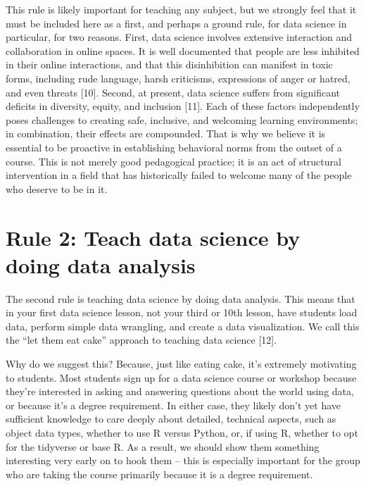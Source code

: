 \documentclass[
  10pt,
  letterpaper,
]{article}
\begin{document}
This rule is likely important for teaching any subject, but we strongly
feel that it must be included here as a first, and perhaps a ground
rule, for data science in particular, for two reasons. First, data
science involves extensive interaction and collaboration in online
spaces. It is well documented that people are less inhibited in their
online interactions, and that this disinhibition can manifest in toxic
forms, including rude language, harsh criticisms, expressions of anger
or hatred, and even threats {[}10{]}. Second, at present, data science
suffers from significant deficits in diversity, equity, and inclusion
{[}11{]}. Each of these factors independently poses challenges to
creating safe, inclusive, and welcoming learning environments; in
combination, their effects are compounded. That is why we believe it is
essential to be proactive in establishing behavioral norms from the
outset of a course. This is not merely good pedagogical practice; it is
an act of structural intervention in a field that has historically
failed to welcome many of the people who deserve to be in it.

\section{Rule 2: Teach data science by doing data
analysis}\label{sec-rule2}

The second rule is teaching data science by doing data analysis. This
means that in your first data science lesson, not your third or 10th
lesson, have students load data, perform simple data wrangling, and
create a data visualization. We call this the ``let them eat cake''
approach to teaching data science {[}12{]}.

Why do we suggest this? Because, just like eating cake, it's extremely
motivating to students. Most students sign up for a data science course
or workshop because they're interested in asking and answering questions
about the world using data, or because it's a degree requirement. In
either case, they likely don't yet have sufficient knowledge to care
deeply about detailed, technical aspects, such as object data types,
whether to use R versus Python, or, if using R, whether to opt for the
tidyverse or base R. As a result, we should show them something
interesting very early on to hook them -- this is especially important
for the group who are taking the course primarily because it is a degree
requirement.
\end{document}
